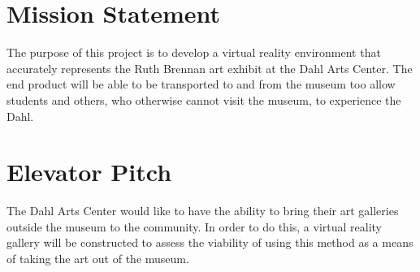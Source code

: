 
\section{Mission Statement}
The purpose of this project is to develop a virtual reality environment that accurately represents the Ruth Brennan art exhibit at the Dahl Arts Center.  The end product will be able to be transported to and from the museum too allow students and others, who otherwise cannot visit the museum, to experience the Dahl.

\section{Elevator Pitch}
The Dahl Arts Center would like to have the ability to bring their art galleries outside the museum to the community.  In order to do this, a virtual reality gallery will be constructed to assess the viability of using this method as a means of taking the art out of the museum.